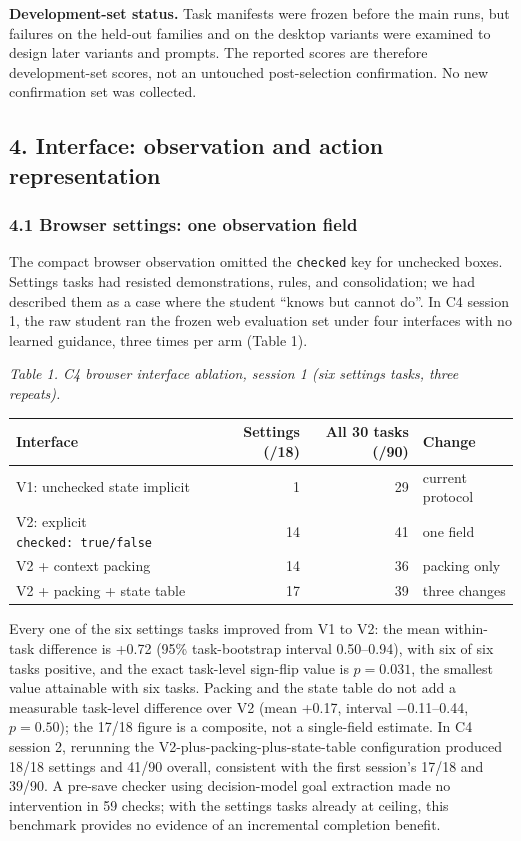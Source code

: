\documentclass[
  10pt,
]{article}
\newcounter{none} %
\begin{document}
\textbf{Development-set status.} Task manifests were frozen before the
main runs, but failures on the held-out families and on the desktop
variants were examined to design later variants and prompts. The
reported scores are therefore development-set scores, not an untouched
post-selection confirmation. No new confirmation set was collected.

\subsection{4. Interface: observation and action
representation}\label{interface-observation-and-action-representation}

\subsubsection{4.1 Browser settings: one observation
field}\label{browser-settings-one-observation-field}

The compact browser observation omitted the \texttt{checked} key for
unchecked boxes. Settings tasks had resisted demonstrations, rules, and
consolidation; we had described them as a case where the student ``knows
but cannot do''. In C4 session 1, the raw student ran the frozen web
evaluation set under four interfaces with no learned guidance, three
times per arm (Table 1).

\emph{Table 1. C4 browser interface ablation, session 1 (six settings
tasks, three repeats).}

{\def\LTcaptype{none} %
\begin{longtable}[]{@{}lrrl@{}}
\toprule\noalign{}
Interface & Settings (/18) & All 30 tasks (/90) & Change \\
\midrule\noalign{}
\endhead
\bottomrule\noalign{}
\endlastfoot
V1: unchecked state implicit & 1 & 29 & current protocol \\
V2: explicit \texttt{checked:\ true/false} & 14 & 41 & one field \\
V2 + context packing & 14 & 36 & packing only \\
V2 + packing + state table & 17 & 39 & three changes \\
\end{longtable}
}

Every one of the six settings tasks improved from V1 to V2: the mean
within-task difference is +0.72 (95\% task-bootstrap interval
0.50--0.94), with six of six tasks positive, and the exact task-level
sign-flip value is \(p=0.031\), the smallest value attainable with six
tasks. Packing and the state table do not add a measurable task-level
difference over V2 (mean +0.17, interval −0.11--0.44, \(p=0.50\)); the
17/18 figure is a composite, not a single-field estimate. In C4 session
2, rerunning the V2-plus-packing-plus-state-table configuration produced
18/18 settings and 41/90 overall, consistent with the first session's
17/18 and 39/90. A pre-save checker using decision-model goal extraction
made no intervention in 59 checks; with the settings tasks already at
ceiling, this benchmark provides no evidence of an incremental
completion benefit.
\end{document}
